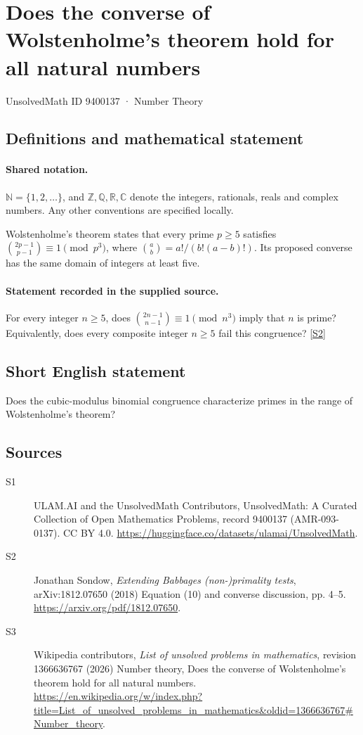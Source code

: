 \documentclass[11pt]{article}
\newcommand{\sref}[2]{\hyperlink{source:#1:#2}{[S#2]}}
\begin{document}
\setcounter{section}{9400136}
\section{Does the converse of Wolstenholme's theorem hold for all natural numbers}\label{9400137}
{\small\sffamily UnsolvedMath ID 9400137 · Number Theory}
\subsection{Definitions and mathematical statement}

\paragraph{Shared notation.}$\mathbb N=\{1,2,\ldots\}$, and $\mathbb Z,\mathbb Q,\mathbb R,\mathbb C$ denote the integers, rationals, reals and complex numbers. Any other conventions are specified locally.


Wolstenholme's theorem states that every prime $p\ge5$ satisfies $\binom{2p-1}{p-1}\equiv1\pmod{p^3}$, where $\binom ab=a!/(b!(a-b)!)$. Its proposed converse has the same domain of integers at least five.
\paragraph{Statement recorded in the supplied source.}
For every integer $n\ge5$, does $\binom{2n-1}{n-1}\equiv1\pmod{n^3}$ imply that $n$ is prime? Equivalently, does every composite integer $n\ge5$ fail this congruence? \sref{9400137}{2}
\subsection{Short English statement}
Does the cubic-modulus binomial congruence characterize primes in the range of Wolstenholme’s theorem?
\subsection{Sources}
\begin{description}
\item[\hypertarget{source:9400137:1}{S1}] ULAM.AI and the UnsolvedMath Contributors, UnsolvedMath: A Curated Collection of Open Mathematics Problems, record 9400137 (AMR-093-0137). CC BY 4.0. \url{https://huggingface.co/datasets/ulamai/UnsolvedMath}.
\item[\hypertarget{source:9400137:2}{S2}] Jonathan Sondow, \emph{Extending Babbage\textquotesingle s (non-)primality tests}, arXiv:1812.07650 (2018) Equation (10) and converse discussion, pp. 4--5. \url{https://arxiv.org/pdf/1812.07650}.
\item[\hypertarget{source:9400137:3}{S3}] Wikipedia contributors, \emph{List of unsolved problems in mathematics}, revision 1366636767 (2026) Number theory, Does the converse of Wolstenholme's theorem hold for all natural numbers. \url{https://en.wikipedia.org/w/index.php?title=List_of_unsolved_problems_in_mathematics&oldid=1366636767#Number_theory}.
\end{description}
\label{end:9400137}
\end{document}
